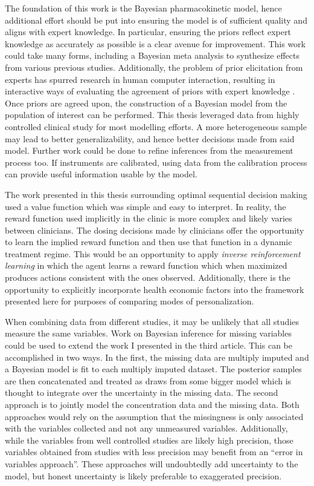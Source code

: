 The foundation of this work is the Bayesian pharmacokinetic model, hence additional effort should be put into ensuring the model is of sufficient quality and aligns with expert knowledge.  In particular, ensuring the priors reflect expert knowledge as accurately as possible is a clear avenue for improvement.  This work could take many forms, including a Bayesian meta analysis to synthesize effects from various previous studies.  Additionally, the problem of prior elicitation from experts has spurred research in human computer interaction, resulting in interactive ways of evaluating the agreement of priors with expert knowledge \cite{sarma2020prior}.  Once priors are agreed upon, the construction of a Bayesian model from the population of interest can be performed.  This thesis leveraged data from highly controlled clinical study for most modelling efforts.  A more heterogeneous sample may lead to better generalizability, and hence better decisions made from said model.  Further work could be done to refine inferences from the measurement process too.  If instruments are calibrated, using data from the calibration process can provide useful information usable by the model.

The work presented in this thesis surrounding optimal sequential decision making used a value function which was simple and easy to interpret.  In reality, the reward function used implicitly in the clinic is more complex and likely varies between clinicians.  The dosing decisions made by clinicians offer the opportunity to learn the implied reward function and then use that function in a dynamic treatment regime.  This would be an opportunity to apply \textit{inverse reinforcement learning} in which the agent learns a reward function which when maximized produces actions consistent with the ones observed.  Additionally, there is the opportunity to explicitly incorporate health economic factors into the  framework presented here for purposes of comparing modes of personalization.

When combining data from different studies, it may be unlikely that all studies measure the same variables.  Work on Bayesian inference for missing variables could be used to extend the work I presented in the third article. This can be accomplished in two ways.  In the first, the missing data are multiply imputed and a Bayesian model is fit to each multiply imputed dataset.  The posterior samples are then concatenated and treated as draws from some bigger model which is thought to integrate over the uncertainty in the missing data.  The second approach is to jointly model the concentration data and the missing data.  Both approaches would rely on the assumption that the missingness is only associated with the variables collected and not any unmeasured variables.  Additionally, while the variables from well controlled studies are likely high precision, those variables obtained from studies with less precision may benefit from an ``error in variables approach''.  These approaches will undoubtedly add uncertainty to the model, but honest uncertainty is likely preferable to exaggerated precision.

